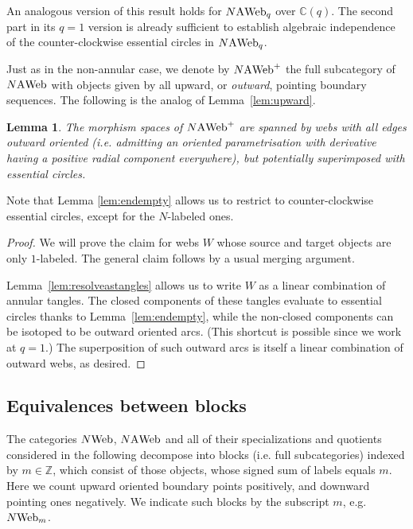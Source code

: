 \documentclass[11pt]{article}
\newtheorem{lemma}[theo]{Lemma}
\theoremstyle{definition}
\numberwithin{equation}{section}
\def\C{{\mathbb C}}
\def\Z{{\mathbb Z}}
\newcommand{\cat}[1]{\ensuremath{\mbox{\bfseries {\upshape {#1}}}}}
\newcommand{\Web}[1][]{#1\cat{Web}}
\newcommand{\AWeb}[1][]{#1\cat{A}\cat{Web}}
\newcommand{\AWebq}[1][]{#1\cat{A}\cat{Web}_{q}}
\newcommand{\AWebp}[1][]{#1\AWeb^+}
\begin{document}
An analogous version of this result holds for $\AWebq[N]$ over $\C(q)$. The second part in its $q=1$ version is already sufficient to establish algebraic independence of the counter-clockwise essential circles in $\AWebq[N]$.

Just as in the non-annular case, we denote by $\AWebp[N]$ the full subcategory
of $\AWeb[N]$ with objects given by all upward, or \emph{outward}, pointing
boundary sequences. The following is the analog of Lemma~\ref{lem:upward}.

\begin{lemma}\label{lem:upwardannulus} The morphism spaces of $\AWebp[N]$ are
spanned by webs with all edges outward oriented (i.e. admitting an oriented parametrisation with
derivative having a positive radial component everywhere), but potentially superimposed with
essential circles.
\end{lemma}

Note that Lemma \ref{lem:endempty} allows us to restrict to counter-clockwise
essential circles, except for the $N$-labeled ones.

\begin{proof}
 We will prove the claim for webs $W$ whose source and target objects are only $1$-labeled. The general claim follows by a usual merging argument.

Lemma~\ref{lem:resolveastangles} allows us to write $W$ as a linear combination of annular tangles. The closed components of these tangles evaluate to essential circles thanks to Lemma~\ref{lem:endempty}, while the non-closed components can be isotoped to be outward oriented arcs. (This shortcut is possible since we work at $q=1$.) The superposition of such outward arcs is itself a linear combination of outward webs, as desired. 
\end{proof}




\subsection{Equivalences between blocks}\label{sec:lambdaequiv}


The categories $\Web[N]$, $\AWeb[N]$ and all of their specializations and
quotients considered in the following decompose into blocks (i.e. full
subcategories) indexed by $m\in \Z$, which consist of those objects, whose
signed sum of labels equals $m$. Here we count upward oriented boundary points
positively, and downward pointing ones negatively. We indicate such blocks by
the subscript $m$, e.g. $\Web[N]_{m}$.
\end{document}
